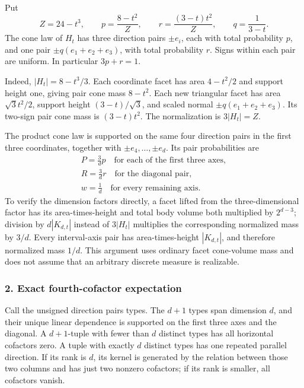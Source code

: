 \documentclass[
  11pt,
]{article}
\begin{document}
Put \[
 Z=24-t^3,\qquad p=\frac{8-t^2}{Z},\qquad
 r=\frac{(3-t)t^2}{Z},\qquad q=\frac1{3-t}.
\] The cone law of \(H_t\) has three direction pairs \(\pm e_i\), each
with total probability \(p\), and one pair \(\pm q(e_1+e_2+e_3)\), with
total probability \(r\). Signs within each pair are uniform. In
particular \(3p+r=1\).

Indeed, \(|H_t|=8-t^3/3\). Each coordinate facet has area \(4-t^2/2\)
and support height one, giving pair cone mass \(8-t^2\). Each new
triangular facet has area \(\sqrt3t^2/2\), support height
\((3-t)/\sqrt3\), and scaled normal \(\pm q(e_1+e_2+e_3)\). Its two-sign
pair cone mass is \((3-t)t^2\). The normalization is \(3|H_t|=Z\).

The product cone law is supported on the same four direction pairs in
the first three coordinates, together with \(\pm e_4,\ldots,\pm e_d\).
Its pair probabilities are \[\begin{gathered}
P=\frac3d p\quad\text{for each of the first three axes},\\
 R=\frac3d r\quad\text{for the diagonal pair},\\
 w=\frac1d\quad\text{for every remaining axis}.
\end{gathered}\] To verify the dimension factors directly, a facet lifted from the
three-dimensional factor has its area-times-height and total body volume
both multiplied by \(2^{d-3}\); division by \(d|K_{d,t}|\) instead of
\(3|H_t|\) multiplies the corresponding normalized mass by \(3/d\).
Every interval-axis pair has area-times-height \(|K_{d,t}|\), and
therefore normalized mass \(1/d\). This argument uses ordinary facet
cone-volume mass and does not assume that an arbitrary discrete measure
is realizable.

\subsubsection{2. Exact fourth-cofactor
expectation}\label{exact-fourth-cofactor-expectation}

Call the unsigned direction pairs types. The \(d+1\) types span
dimension \(d\), and their unique linear dependence is supported on the
first three axes and the diagonal. A \(d+1\)-tuple with fewer than \(d\)
distinct types has all horizontal cofactors zero. A tuple with exactly
\(d\) distinct types has one repeated parallel direction. If its rank is
\(d\), its kernel is generated by the relation between those two columns
and has just two nonzero cofactors; if its rank is smaller, all
cofactors vanish.
\end{document}
